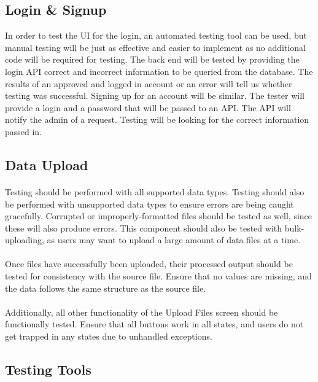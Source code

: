 \documentclass[12pt,oneside,letterpaper]{article}
\begin{document}
\subsection{Login \& Signup}
In order to test the UI for the login, an automated testing tool can be used, but manual testing will be just as effective and easier to implement as no additional code will be required for testing. The back end will be tested by providing the login API correct and incorrect information to be queried from the database. The results of an approved and logged in account or an error will tell us whether testing was successful.
Signing up for an account will be similar. The tester will provide a login and a password that will be passed to an API. The API will notify the admin of a request. Testing will be looking for the correct information passed in.

\subsection{Data Upload}
\paragraph{} Testing should be performed with all supported data types. Testing should also be performed with unsupported data types to ensure errors are being caught gracefully. Corrupted or improperly-formatted files should be tested as well, since these will also produce errors. This component should also be tested with bulk-uploading, as users may want to upload a large amount of data files at a time.
\paragraph{} Once files have successfully been uploaded, their processed output should be tested for consistency with the source file. Ensure that no values are missing, and the data follows the same structure as the source file.
\paragraph{} Additionally, all other functionality of the Upload Files screen should be functionally tested. Ensure that all buttons work in all states, and users do not get trapped in any states due to unhandled exceptions.

\subsection{Testing Tools}
\end{document}
